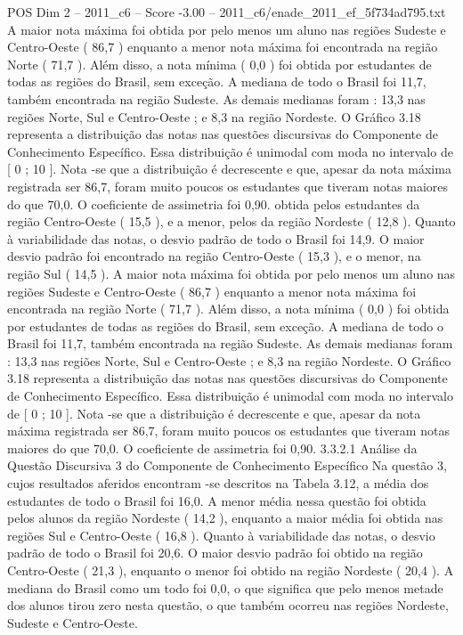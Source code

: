 \begin{textsample}{POS Dim 2 – 2011\_c6 – Score -3.00 – 2011\_c6/enade\_2011\_ef\_5f734ad795.txt}
A maior nota máxima foi obtida por pelo menos um aluno nas regiões Sudeste e Centro-Oeste ( 86,7 ) enquanto a menor nota máxima foi encontrada na região Norte ( 71,7 ).
Além disso, a nota mínima ( 0,0 ) foi obtida por estudantes de todas as regiões do Brasil, sem exceção.
A mediana de todo o Brasil foi 11,7, também encontrada na região Sudeste.
As demais medianas foram : 13,3 nas regiões Norte, Sul e Centro-Oeste ; e 8,3 na região Nordeste.
O Gráfico 3.18 representa a distribuição das notas nas questões discursivas do Componente de Conhecimento Específico.
Essa distribuição é unimodal com moda no intervalo de [ 0 ; 10 ].
Nota -se que a distribuição é decrescente e que, apesar da nota máxima registrada ser 86,7, foram muito poucos os estudantes que tiveram notas maiores do que 70,0.
O coeficiente de assimetria foi 0,90. obtida pelos estudantes da região Centro-Oeste ( 15,5 ), e a menor, pelos da região Nordeste ( 12,8 ).
Quanto à variabilidade das notas, o desvio padrão de todo o Brasil foi 14,9.
O maior desvio padrão foi encontrado na região Centro-Oeste ( 15,3 ), e o menor, na região Sul ( 14,5 ).
A maior nota máxima foi obtida por pelo menos um aluno nas regiões Sudeste e Centro-Oeste ( 86,7 ) enquanto a menor nota máxima foi encontrada na região Norte ( 71,7 ).
Além disso, a nota mínima ( 0,0 ) foi obtida por estudantes de todas as regiões do Brasil, sem exceção.
A mediana de todo o Brasil foi 11,7, também encontrada na região Sudeste.
As demais medianas foram : 13,3 nas regiões Norte, Sul e Centro-Oeste ; e 8,3 na região Nordeste.
O Gráfico 3.18 representa a distribuição das notas nas questões discursivas do Componente de Conhecimento Específico.
Essa distribuição é unimodal com moda no intervalo de [ 0 ; 10 ].
Nota -se que a distribuição é decrescente e que, apesar da nota máxima registrada ser 86,7, foram muito poucos os estudantes que tiveram notas maiores do que 70,0.
O coeficiente de assimetria foi 0,90. 3.3.2.1 Análise da Questão Discursiva 3 do Componente de Conhecimento Específico Na questão 3, cujos resultados aferidos encontram -se descritos na Tabela 3.12, a média dos estudantes de todo o Brasil foi 16,0.
A menor média nessa questão foi obtida pelos alunos da região Nordeste ( 14,2 ), enquanto a maior média foi obtida nas regiões Sul e Centro-Oeste ( 16,8 ).
Quanto à variabilidade das notas, o desvio padrão de todo o Brasil foi 20,6.
O maior desvio padrão foi obtido na região Centro-Oeste ( 21,3 ), enquanto o menor foi obtido na região Nordeste ( 20,4 ).
A mediana do Brasil como um todo foi 0,0, o que significa que pelo menos metade dos alunos tirou zero nesta questão, o que também ocorreu nas regiões Nordeste, Sudeste e Centro-Oeste.

\end{textsample}
